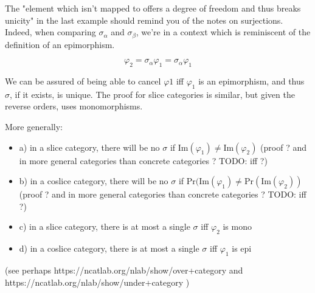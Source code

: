 The "element which isn't mapped to offers a degree of freedom and thus breaks unicity" in the last example should remind you of the notes on surjections. Indeed, when comparing $\sigma_\alpha$ and $\sigma_\beta$, we're in a context which is reminiscent of the definition of an epimorphism.

$$\varphi_2 = \sigma_\alpha \varphi_1 = \sigma_\alpha \varphi_1 $$

We can be assured of being able to cancel $\varphi 1$ iff $\varphi_1$ is an epimorphism, and thus $\sigma$, if it exists, is unique. The proof for slice categories is similar, but given the reverse orders, uses monomorphisms.

More generally: 

\begin{itemize}
	\item a) in a slice category, there will be no $\sigma$ if $\text{Im} (\varphi_1) \neq \text{Im} (\varphi_2)$ (proof ? and in more general categories than concrete categories ? TODO: iff ?)
	\item b) in a coslice category, there will be no $\sigma$ if $\text{Pr} (\text{Im} (\varphi_1) \neq \text{Pr} (\text{Im} (\varphi_2))$ (proof ? and in more general categories than concrete categories ? TODO: iff ?)
	\item c) in a slice category, there is at most a single $\sigma$ iff $\varphi_2$ is mono
	\item d) in a coslice category, there is at most a single $\sigma$ iff $\varphi_1$ is epi
\end{itemize}

(see perhaps https://ncatlab.org/nlab/show/over+category and https://ncatlab.org/nlab/show/under+category )